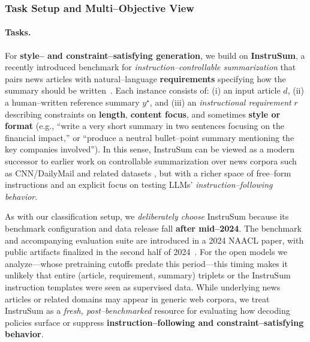 \subsubsection{Task Setup and Multi--Objective View}
\label{subsubsec:style-setup}

\paragraph{Tasks.}
For \textbf{style-- and constraint--satisfying generation}, we build on
\textbf{InstruSum}, a recently introduced benchmark for
\emph{instruction--controllable summarization} that pairs news articles
with natural--language \textbf{requirements} specifying how the summary
should be written~\citep{liu2024instrusum}. Each instance consists of:
(i) an input article $d$, (ii) a human--written reference summary
$y^\star$, and (iii) an \emph{instructional requirement} $r$
describing constraints on \textbf{length}, \textbf{content focus}, and
sometimes \textbf{style or format} (e.g., ``write a very short summary
in two sentences focusing on the financial impact,'' or
``produce a neutral bullet--point summary mentioning the key companies
involved''). In this sense, InstruSum can be viewed as a modern
successor to earlier work on controllable summarization over news
corpora such as CNN/DailyMail and related datasets
\citep{hermann2015teaching,nallapati2016abstractive,
fan2018controllable,he2020ctrlsum,chan2021constrained}, but with a
richer space of free--form instructions and an explicit focus on testing
LLMs' \emph{instruction--following behavior}.

As with our classification setup, we \emph{deliberately choose}
InstruSum because its benchmark configuration and data release fall
\textbf{after mid--2024}. The benchmark and accompanying evaluation
suite are introduced in a 2024 NAACL paper, with public artifacts
finalized in the second half of 2024~\citep{liu2024instrusum}. For the
open models we analyze---whose pretraining cutoffs predate this
period---this timing makes it unlikely that entire
(article, requirement, summary) triplets or the InstruSum instruction
templates were seen as supervised data. While underlying news articles
or related domains may appear in generic web corpora, we treat
InstruSum as a \emph{fresh, post--benchmarked} resource for evaluating
how decoding policies surface or suppress
\textbf{instruction--following and constraint--satisfying behavior}.

